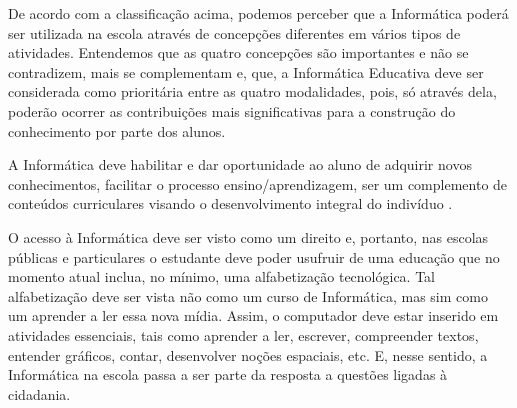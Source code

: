 De acordo com a classificação acima, podemos perceber que a Informática
poderá ser utilizada na escola através de concepções diferentes em vários
tipos de atividades. Entendemos que as quatro concepções são importantes e
não se contradizem, mais se complementam e, que, a Informática Educativa
deve ser considerada como prioritária entre as quatro modalidades, pois, só
através dela, poderão ocorrer as contribuições mais significativas para a
construção do conhecimento por parte dos alunos.

A Informática deve habilitar e dar oportunidade ao aluno de adquirir
novos conhecimentos, facilitar o processo ensino/aprendizagem, ser um
complemento de conteúdos curriculares visando o desenvolvimento integral do
indivíduo \cite{lopes:2002}.

O acesso à Informática deve ser visto como um direito e, portanto, nas
escolas públicas e particulares o estudante deve poder usufruir de uma
educação que no momento atual inclua, no mínimo, uma alfabetização
tecnológica. Tal alfabetização deve ser vista não como um curso de
Informática, mas sim como um aprender a ler essa nova mídia. Assim, o
computador deve estar inserido em atividades essenciais, tais como aprender
a ler, escrever, compreender textos, entender gráficos, contar, desenvolver
noções espaciais, etc. E, nesse sentido, a Informática na escola passa a ser
parte da resposta a questões ligadas à cidadania.
